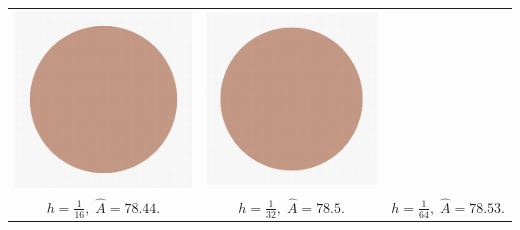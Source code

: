\begin{frame}
\begin{tabular}{ccc}
\includegraphics[scale=0.4]{figures/digital-estimators/multigrid/h003125.png} &
\includegraphics[scale=0.4]{figures/digital-estimators/multigrid/h003125.png} \\
$h=\frac{1}{16},\; \hat{A}=78.44.$ & $h=\frac{1}{32},\; \hat{A}=78.5.$ & $h=\frac{1}{64},\; \hat{A}=78.53.$
\end{tabular}

\end{frame}

